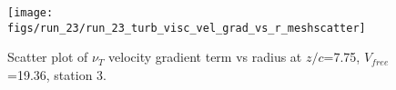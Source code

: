 \begin{figure}[H]
\centering
\texttt{[image: figs/run\_23/run\_23\_turb\_visc\_vel\_grad\_vs\_r\_meshscatter]}
\caption{Scatter plot of $\nu_T$ velocity gradient term vs radius at $z/c$=7.75, $V_{free}$=19.36, station 3.}
\label{fig:run_23_turb_visc_vel_grad_vs_r_meshscatter}
\end{figure}


